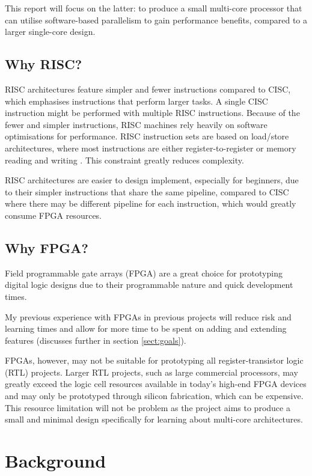 This report will focus on the latter: to produce a small multi-core processor that can utilise software-based parallelism to gain performance benefits, compared to a larger single-core design.

\section{Why RISC?}
RISC architectures feature simpler and fewer instructions compared to CISC, which emphasises instructions that perform larger tasks. A single CISC instruction might be performed with multiple RISC instructions. Because of the fewer and simpler instructions, RISC machines rely heavily on software optimisations for performance. 
RISC instruction sets are based on load/store architectures, where most instructions are either register-to-register or memory reading and writing \cite{flynn1995computer}. This constraint greatly reduces complexity.

RISC architectures are easier to design implement, especially for beginners, due to their simpler instructions that share the same pipeline, compared to CISC where there may be different pipeline for each instruction, which would greatly consume FPGA resources.

\section{Why FPGA?}
Field programmable gate arrays (FPGA) are a great choice for prototyping digital logic designs due to their programmable nature and quick development times. 

My previous experience with FPGAs in previous projects will reduce risk and learning times and allow for more time to be spent on adding and extending features (discusses further in section \ref{sect:goals}).

FPGAs, however, may not be suitable for prototyping all register-transistor logic (RTL) projects. Larger RTL projects, such as large commercial processors, may greatly exceed the logic cell resources available in today's high-end FPGA devices and may only be prototyped through silicon fabrication, which can be expensive. This resource limitation will not be problem as the project aims to produce a small and minimal design specifically for learning about multi-core architectures.

\chapter{Background}
{%
\startcontents[chapters]
}

